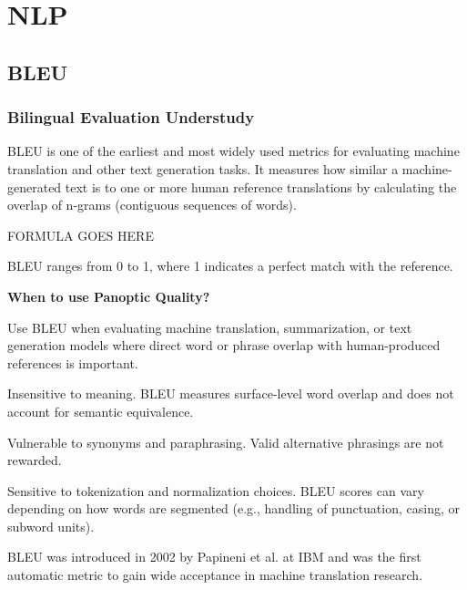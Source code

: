 \chapter{NLP}


\clearpage
\thispagestyle{nlpstyle}
\section{BLEU}
\subsection{Bilingual Evaluation Understudy}

BLEU is one of the earliest and most widely used metrics for evaluating machine translation and other
text generation tasks. It measures how similar a machine-generated text is to one or more human
reference translations by calculating the overlap of n-grams (contiguous sequences of words).

\begin{center}
    FORMULA GOES HERE
\end{center}

BLEU ranges from 0 to 1, where 1 indicates a perfect match with the reference.

\textbf{When to use Panoptic Quality?}

Use BLEU when evaluating machine translation, summarization, or text generation models where direct
word or phrase overlap with human-produced references is important.

{
\item Insensitive to meaning. BLEU measures surface-level word overlap and does not account for
semantic equivalence.
\item Vulnerable to synonyms and paraphrasing. Valid alternative phrasings are not rewarded.
\item Sensitive to tokenization and normalization choices. BLEU scores can vary depending on how words
are segmented (e.g., handling of punctuation, casing, or subword units).
}

\clearpage

\thispagestyle{customstyle}

{BLEU was introduced in 2002 by Papineni et al. at IBM and was the first automatic metric to gain
wide acceptance in machine translation research.}